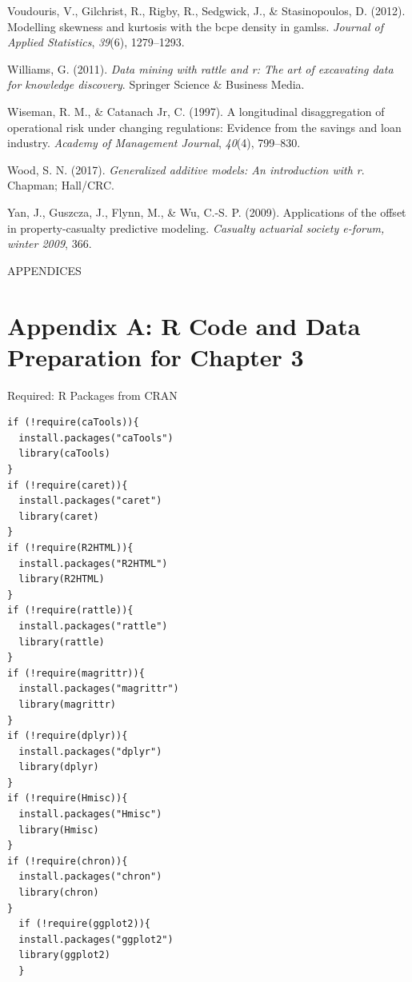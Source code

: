 \documentclass{DissertateUSU}
\begin{document}
\leavevmode\hypertarget{ref-voudouris2012modelling}{}%
Voudouris, V., Gilchrist, R., Rigby, R., Sedgwick, J., \& Stasinopoulos,
D. (2012). Modelling skewness and kurtosis with the bcpe density in
gamlss. \emph{Journal of Applied Statistics}, \emph{39}(6), 1279--1293.

\leavevmode\hypertarget{ref-williams2011data}{}%
Williams, G. (2011). \emph{Data mining with rattle and r: The art of
excavating data for knowledge discovery}. Springer Science \& Business
Media.

\leavevmode\hypertarget{ref-wiseman1997longitudinal}{}%
Wiseman, R. M., \& Catanach Jr, C. (1997). A longitudinal disaggregation
of operational risk under changing regulations: Evidence from the
savings and loan industry. \emph{Academy of Management Journal},
\emph{40}(4), 799--830.

\leavevmode\hypertarget{ref-wood2017generalized}{}%
Wood, S. N. (2017). \emph{Generalized additive models: An introduction
with r}. Chapman; Hall/CRC.

\leavevmode\hypertarget{ref-yan2009applications}{}%
Yan, J., Guszcza, J., Flynn, M., \& Wu, C.-S. P. (2009). Applications of
the offset in property-casualty predictive modeling. \emph{Casualty
actuarial society e-forum, winter 2009}, 366.

\clearpage
{}
\fancyhead[R]{\thepage}
\fancyfoot[C]{}

\vspace*{\fill}
  \begin{center}
    APPENDICES 
  \end{center}
\vspace*{\fill}

\clearpage

\doublespacing

\section{Appendix A: R Code and Data Preparation for Chapter 3}
\label{sec:Appendix A: R Code and Data Preparation for Chapter 3}

\singlespace

Required: R Packages from CRAN

\small

\begin{verbatim}
if (!require(caTools)){
  install.packages("caTools")
  library(caTools)
}
if (!require(caret)){
  install.packages("caret")
  library(caret)
}
if (!require(R2HTML)){
  install.packages("R2HTML")
  library(R2HTML)
}
if (!require(rattle)){
  install.packages("rattle")
  library(rattle)
}
if (!require(magrittr)){
  install.packages("magrittr")
  library(magrittr)
}
if (!require(dplyr)){
  install.packages("dplyr")
  library(dplyr)
}
if (!require(Hmisc)){
  install.packages("Hmisc")
  library(Hmisc)
}
if (!require(chron)){
  install.packages("chron")
  library(chron)
}  
  if (!require(ggplot2)){
  install.packages("ggplot2")
  library(ggplot2)
  }
\end{verbatim}
\end{document}
